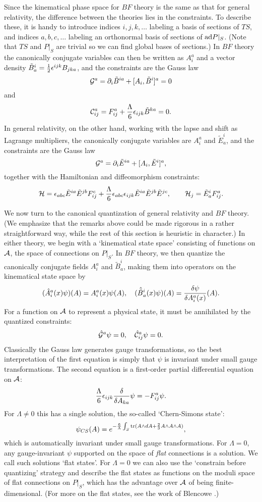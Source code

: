 Since the kinematical phase space for $BF$ theory is the same as that
for general relativity, the difference between the theories lies in the
constraints.  To describe these, it is handy to introduce indices
$i,j,k,\dots$ labeling a basis of sections of $TS$, and indices
$a,b,c,\dots$ labeling an orthonormal basis of sections of ${\rm ad} P|_S$.
(Note that $TS$ and $P|_S$ are trivial so we can find global bases of
sections.)  In $BF$ theory the canonically conjugate variables can then
be written as $A_i^a$ and a vector density $\tilde B^i_a = {1\over
2}\epsilon^{ijk} B_{jka}$, and the constraints are the Gauss law
\[       \G^a = \partial_i \tilde B^{ia} + [A_i, \tilde B^i]^a = 0\]
 and
\[      \Con^a_{ij} =
F_{ij}^a + {\Lambda \over 6} \epsilon_{ijk} \tilde B^{ka} = 0. \]
In general relativity, on the other hand, working with the lapse and
shift as Lagrange multipliers, the canonically conjugate
variables are $A_i^a$ and $\tilde E^i_a$, and the constraints are
the Gauss law
\[    \G^a = \partial_i \tilde E^{ia} + [A_i,\tilde E^i]^a ,\]
together with the Hamiltonian and diffeomorphism constraints:
\[      \H = \epsilon_{abc} \tilde
E^{ia} \tilde E^{jb} F_{ij}^c + {\Lambda \over 6}
\epsilon_{abc}\epsilon_{ijk}  \tilde E^{ia} \tilde E^{jb} \tilde
E^{jc} , \qquad        \H_j = \tilde E^i_a F^a_{ij}   .\]

We now turn to the canonical quantization of general relativity and $BF$
theory.  (We emphasize that the remarks above could be made rigorous in
a rather straightforward way, while the rest of this section is
heuristic in character.)  In either theory, we begin with a `kinematical
state space' consisting of functions on $\A$, the space of connections
on $P|_S$.  In $BF$ theory, we then quantize the canonically conjugate
fields $A_i^a$ and $\tilde B^i_a$, making them into operators on the
kinematical state space by
\[        (\hat A_i^a(x) \psi)(A) = A_i^a(x)\psi(A), \quad
          (\hat {\tilde B}{}^i_a(x) \psi)(A) = {\delta \psi \over \delta
A_i^a(x)}(A).\]
For a function on $\A$ to represent a physical state,
it must be annihilated by the quantized constraints:
\[           \hat \G^a \psi = 0, \quad \hat \Con^a_{ij} \psi = 0.\]
Classically the Gauss law generates gauge transformations, so the
best interpretation of the first equation is simply that $\psi$ is
invariant under small gauge transformations.  The second equation is a
first-order partial differential equation on $\A$:
\[      {\Lambda \over 6} \epsilon_{ijk}{\delta \over \delta
A_{ka}}\psi = - F_{ij}^a \psi .\]
For $\Lambda \ne 0$ this has a single solution, the so-called
`Chern-Simons state':
\[        \psi_{CS}(A) = e^{-{6\over \Lambda}\int_S {\rm tr}(A \wedge
dA + {2\over 3} A \wedge A \wedge A) }  ,\]
which is automatically invariant under small gauge transformations.  For
$\Lambda = 0$, any gauge-invariant $\psi$ supported on the space of {\it
flat} connections is a solution.  We call such solutions `flat states'.
For $\Lambda = 0$ we can also use the `constrain before quantizing'
strategy and describe the flat states as functions on the moduli space
of flat connections on $P|_S$, which has the advantage over $\A$ of
being finite-dimensional.  (For more on the flat states, see the work of
Blencowe \cite{Blencowe}.)

